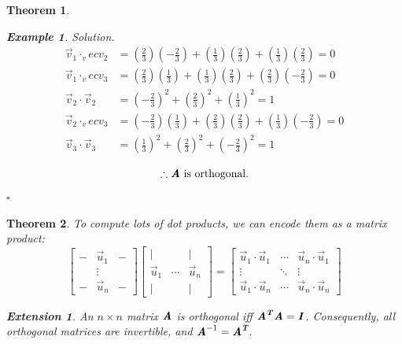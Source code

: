 \documentclass[12pt, a4paper]{article}
\newtheorem{thm}{Theorem}[subsection]
\newtheorem{eg}{Example}[subsection]
\newenvironment*{sol}{\indent\textit{Solution. }}{\hfill{$\square$}\par}
\newtheorem*{ext}{\indent Extension}
\def\T{{\textbf{\emph{T}}}}
\def\vecv{\vec{v}}
\def\vecu{\vec{u}}
\def\matrixA{\textbf{\emph{A}}}
\def\matrixI{\textbf{\emph{I}}}
\begin{document}
\begin{thm}
\begin{eg}
\begin{sol}
$$\begin{aligned}
				\vecv_1\cdot_vecv_2&=\left(\frac{2}{3}\right)\left(-\frac{2}{3}\right)+\left(\frac{1}{3}\right)\left(\frac{2}{3}\right)+\left(\frac{1}{3}\right)\left(\frac{2}{3}\right)=0\\
				\vecv_1\cdot_vecv_3&=\left(\frac{2}{3}\right)\left(\frac{1}{3}\right)+\left(\frac{1}{3}\right)\left(\frac{2}{3}\right)+\left(\frac{2}{3}\right)\left(-\frac{2}{3}\right)=0\\
				\vecv_2\cdot\vecv_2&=\left(-\frac{2}{3}\right)^2+\left(\frac{2}{3}\right)^2+\left(\frac{1}{3}\right)^2=1	\\
				\vecv_2\cdot_vecv_3&=\left(-\frac{2}{3}\right)\left(\frac{1}{3}\right)+\left(\frac{2}{3}\right)\left(\frac{2}{3}\right)+\left(\frac{1}{3}\right)\left(-\frac{2}{3}\right)=0\\
				\vecv_3\cdot\vecv_3&=\left(\frac{1}{3}\right)^2+\left(\frac{2}{3}\right)^2+\left(-\frac{2}{3}\right)^2=1	\\
			\end{aligned}$$
			\[\therefore\matrixA\text{ is orthogonal.}\]
		\end{sol}
	\end{eg}
\end{thm}
\begin{thm}
	To compute lots of dot products, we can encode them as a matrix product: 
	\[\begin{bmatrix}-&\vecu_1&-\\&\vdots&\\-&\vecu_n&-\end{bmatrix}\begin{bmatrix}|&&|\\\vecu_1&\cdots&\vecu_n\\|&&|\end{bmatrix}=\begin{bmatrix}\vecu_1\cdot\vecu_1&\cdots&\vecu_n\cdot\vecu_1\\\vdots&\ddots&\vdots\\\vecu_1\cdot\vecu_n&\cdots&\vecu_n\cdot\vecu_n\end{bmatrix}\]
	\begin{ext}
		An $n\times n$ matrix $\matrixA$ is orthogonal \emph{iff} $\matrixA^\T\matrixA=\matrixI$. Consequently, all orthogonal matrices are invertible, and $\matrixA^{-1}=\matrixA^\T.$
	\end{ext}
\end{thm}
\end{document}
